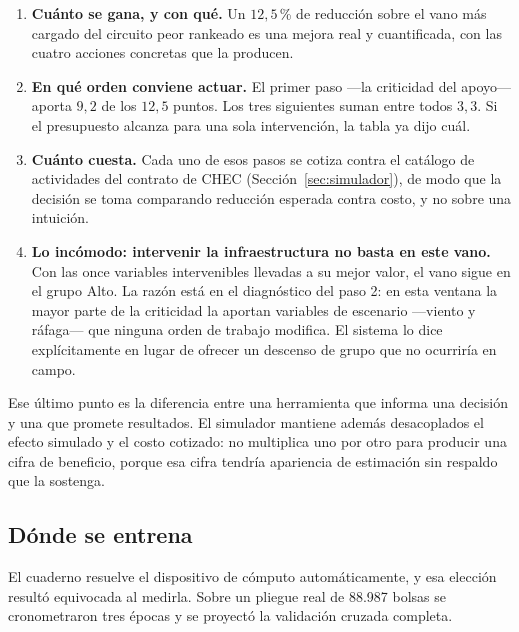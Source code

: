 \documentclass[11pt,a4paper]{article}
\begin{document}
\begin{bloquenuevo}
\begin{enumerate}[itemsep=0.25em]
  \item \textbf{Cuánto se gana, y con qué.} Un $12{,}5$\,\% de reducción sobre el vano más
        cargado del circuito peor rankeado es una mejora real y cuantificada, con las cuatro
        acciones concretas que la producen.
  \item \textbf{En qué orden conviene actuar.} El primer paso ---la criticidad del apoyo---
        aporta $9{,}2$ de los $12{,}5$ puntos. Los tres siguientes suman entre todos $3{,}3$.
        Si el presupuesto alcanza para una sola intervención, la tabla ya dijo cuál.
  \item \textbf{Cuánto cuesta.} Cada uno de esos pasos se cotiza contra el catálogo de
        actividades del contrato de CHEC (Sección~\ref{sec:simulador}), de modo que la decisión
        se toma comparando reducción esperada contra costo, y no sobre una intuición.
  \item \textbf{Lo incómodo: intervenir la infraestructura no basta en este vano.} Con las once
        variables intervenibles llevadas a su mejor valor, el vano sigue en el grupo Alto. La
        razón está en el diagnóstico del paso 2: en esta ventana la mayor parte de la
        criticidad la aportan variables de escenario ---viento y ráfaga--- que ninguna orden de
        trabajo modifica. El sistema lo dice explícitamente en lugar de ofrecer un descenso de
        grupo que no ocurriría en campo.
\end{enumerate}

Ese último punto es la diferencia entre una herramienta que informa una decisión y una que
promete resultados. El simulador mantiene además desacoplados el efecto simulado y el costo
cotizado: no multiplica uno por otro para producir una cifra de beneficio, porque esa cifra
tendría apariencia de estimación sin respaldo que la sostenga.
\end{bloquenuevo}

\subsection{Dónde se entrena}

El cuaderno resuelve el dispositivo de cómputo automáticamente, y esa elección resultó
equivocada al medirla. Sobre un pliegue real de 88.987 bolsas se cronometraron tres épocas y se
proyectó la validación cruzada completa.
\end{document}
